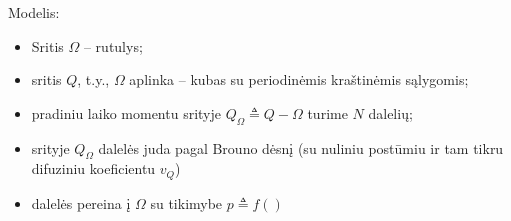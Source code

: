 \documentclass[10pt,a4paper]{article}
\begin{document}
Modelis:
\begin{itemize}
\item Sritis $\Omega$ – rutulys;
\item sritis $Q$, t.y.,    $\Omega$ aplinka – kubas su periodinėmis kraštinėmis sąlygomis;
\item pradiniu laiko momentu srityje $Q_\Omega \triangleq Q - \Omega$ turime $N$ dalelių;
\item srityje $Q_\Omega$ dalelės juda pagal Brouno dėsnį (su nuliniu postūmiu ir tam tikru difuziniu koeficientu $v_Q$)  
\item  dalelės pereina į $\Omega$ su tikimybe $p \triangleq f() $  
\end{itemize}




   
\end{document}

